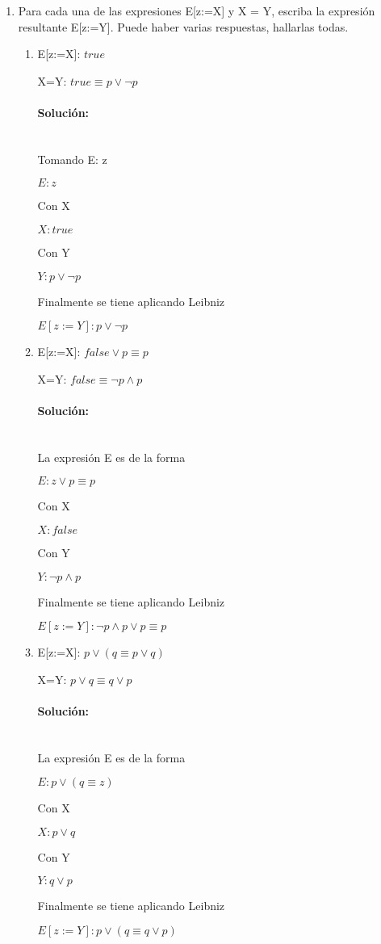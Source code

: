 \documentclass{article}
\newcommand{\myparagraph}[1]{\paragraph{#1}\mbox{}\\}
\begin{document}
\begin{enumerate}
	\item Para cada una de las expresiones E[z:=X] y  X = Y, escriba la expresión resultante
E[z:=Y]. Puede haber varias respuestas, hallarlas todas.

	\begin{enumerate}
		\item E[z:=X]: $true$\par
		 X=Y: $true \equiv p \lor \neg p$

			\myparagraph{Solución:}
			\textlangle{} Tomando E: z \textrangle\par
			$E: z$\par
			\textlangle{} Con X \textrangle\par
			$X: true$\par
			\textlangle{} Con Y \textrangle\par
			$Y: p \lor \neg p$\par
			\textlangle{} Finalmente se tiene aplicando Leibniz \textrangle\par
			$E[z:=Y]: p \lor \neg p$\par
			\hspace{0.8cm}

		\item E[z:=X]: $false \lor p \equiv p$ \par
		 X=Y: $false \equiv \neg p \land p$
		 
			\myparagraph{Solución:}
			\textlangle{} La expresión E es de la forma \textrangle\par
			$E: z \lor p \equiv p$\par
			\textlangle{} Con X \textrangle\par
			$X: false$\par
			\textlangle{} Con Y \textrangle\par
			$Y: \neg p \land p$\par
			\textlangle{} Finalmente se tiene aplicando Leibniz \textrangle\par
			$E[z:=Y]: \neg p \land p \lor p \equiv p$\par
			\hspace{0.8cm}

		\item E[z:=X]: $p \lor (q \equiv p \lor q)$ \par
		 X=Y: $p \lor q \equiv q \lor p$
		 
			\myparagraph{Solución:}
			\textlangle{} La expresión E es de la forma \textrangle\par
			$E: p \lor (q \equiv z )$\par
			\textlangle{} Con X \textrangle\par
			$X: p \lor q$\par
			\textlangle{} Con Y \textrangle\par
			$Y: q \lor p$\par
			\textlangle{} Finalmente se tiene aplicando Leibniz \textrangle\par
			$E[z:=Y]: p \lor (q \equiv q \lor p )$\par
			\hspace{0.8cm}


\end{enumerate}
\end{enumerate}
\end{document}
